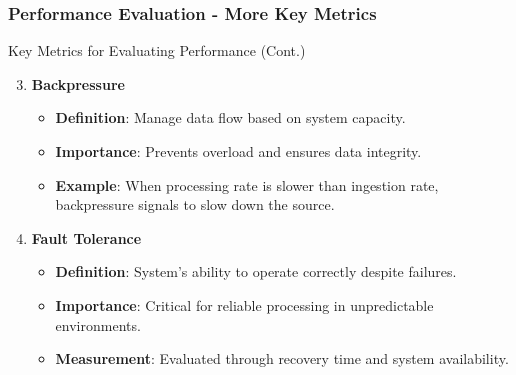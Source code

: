 \documentclass[aspectratio=169]{beamer}
\begin{document}
\begin{frame}[fragile]
    \frametitle{Performance Evaluation - More Key Metrics}
    \begin{block}{Key Metrics for Evaluating Performance (Cont.)}
        \begin{enumerate}
            \setcounter{enumi}{2} %
            \item \textbf{Backpressure}
                \begin{itemize}
                    \item \textbf{Definition}: Manage data flow based on system capacity.
                    \item \textbf{Importance}: Prevents overload and ensures data integrity.
                    \item \textbf{Example}: When processing rate is slower than ingestion rate, backpressure signals to slow down the source.
                \end{itemize}
            \item \textbf{Fault Tolerance}
                \begin{itemize}
                    \item \textbf{Definition}: System’s ability to operate correctly despite failures.
                    \item \textbf{Importance}: Critical for reliable processing in unpredictable environments.
                    \item \textbf{Measurement}: Evaluated through recovery time and system availability.
                \end{itemize}
        \end{enumerate}
    \end{block}
\end{frame}
\end{document}
